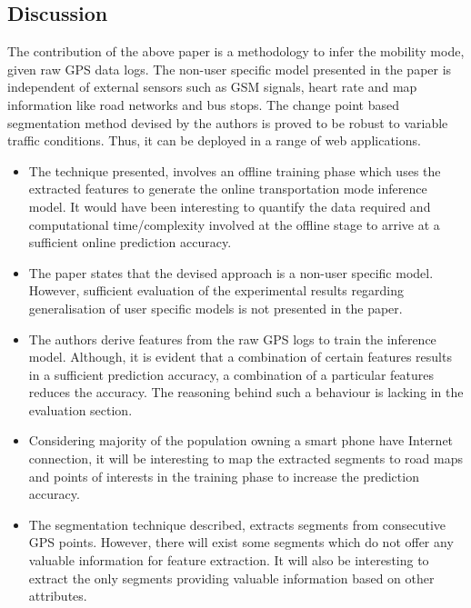 \subsection*{Discussion}

The contribution of the above paper is a methodology to infer the mobility mode, given raw GPS
data logs. The non-user specific model presented in the paper is independent of external sensors
such as GSM signals, heart rate and map information like road networks and bus stops. The change
point based segmentation method devised by the authors is proved to be robust to variable traffic
conditions. Thus, it can be deployed in a range of web applications.

\begin{itemize}

\item The technique presented, involves an offline training phase which uses the extracted features
to generate the online transportation mode inference model. It would have been interesting to quantify
the data required and computational time/complexity involved at the offline stage to arrive at a 
sufficient online prediction accuracy.

\item The paper states that the devised approach is a non-user specific model. However, sufficient
evaluation of the experimental results regarding generalisation of user specific models is not presented
in the paper.

\item The authors derive features from the raw GPS logs to train the inference model. Although,
it is evident that a combination of certain features results in a sufficient prediction accuracy, a
combination of a particular features reduces the accuracy. The reasoning behind such a behaviour is
lacking in the evaluation section.

\item Considering majority of the population owning a smart phone have Internet connection, it will be
interesting to map the extracted segments to road maps and points of interests in the training phase
to increase the prediction accuracy.

\item The segmentation technique described, extracts segments from consecutive GPS points. However, there
will exist some segments which do not offer any valuable information for feature extraction. It will
also be interesting to extract the only segments providing valuable information based on other
 attributes.
\end{itemize}